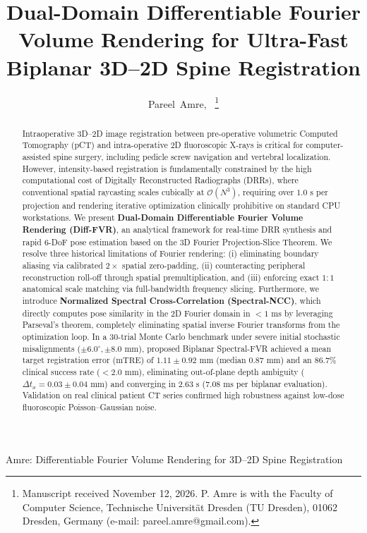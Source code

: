 \documentclass[journal,twocolumn]{IEEEtran}
\begin{document}
\title{Dual-Domain Differentiable Fourier Volume Rendering for Ultra-Fast Biplanar 3D--2D Spine Registration}

\author{Pareel~Amre,~%
\thanks{Manuscript received November 12, 2026. P. Amre is with the Faculty of Computer Science, Technische Universit\"at Dresden (TU Dresden), 01062 Dresden, Germany (e-mail: pareel.amre@gmail.com).}%
}

%
{Amre: Differentiable Fourier Volume Rendering for 3D--2D Spine Registration}

\maketitle

\begin{abstract}
Intraoperative 3D--2D image registration between pre-operative volumetric Computed Tomography (pCT) and intra-operative 2D fluoroscopic X-rays is critical for computer-assisted spine surgery, including pedicle screw navigation and vertebral localization. However, intensity-based registration is fundamentally constrained by the high computational cost of Digitally Reconstructed Radiographs (DRRs), where conventional spatial raycasting scales cubically at $\mathcal{O}(N^3)$, requiring over $1.0\text{ s}$ per projection and rendering iterative optimization clinically prohibitive on standard CPU workstations. We present \textbf{Dual-Domain Differentiable Fourier Volume Rendering (Diff-FVR)}, an analytical framework for real-time DRR synthesis and rapid 6-DoF pose estimation based on the 3D Fourier Projection-Slice Theorem. We resolve three historical limitations of Fourier rendering: (i) eliminating boundary aliasing via calibrated $2\times$ spatial zero-padding, (ii) counteracting peripheral reconstruction roll-off through spatial premultiplication, and (iii) enforcing exact $1:1$ anatomical scale matching via full-bandwidth frequency slicing. Furthermore, we introduce \textbf{Normalized Spectral Cross-Correlation (Spectral-NCC)}, which directly computes pose similarity in the 2D Fourier domain in $< 1\text{ ms}$ by leveraging Parseval's theorem, completely eliminating spatial inverse Fourier transforms from the optimization loop. In a 30-trial Monte Carlo benchmark under severe initial stochastic misalignments ($\pm 6.0^\circ, \pm 8.0\text{ mm}$), proposed Biplanar Spectral-FVR achieved a mean target registration error ($\text{mTRE}$) of $1.11 \pm 0.92\text{ mm}$ (median $0.87\text{ mm}$) and an $86.7\%$ clinical success rate ($<2.0\text{ mm}$), eliminating out-of-plane depth ambiguity ($\Delta t_x = 0.03 \pm 0.04\text{ mm}$) and converging in $2.63\text{ s}$ ($7.08\text{ ms}$ per biplanar evaluation). Validation on real clinical patient CT series confirmed high robustness against low-dose fluoroscopic Poisson--Gaussian noise.
\end{abstract}
\end{document}
